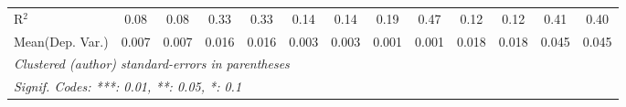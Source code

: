 \begin{tabular}{lcccccccccccc}
   R$^2$                                    & 0.08          & 0.08            & 0.33         & 0.33     & 0.14           & 0.14          & 0.19    & 0.47           & 0.12          & 0.12            & 0.41    & 0.40\\  
Mean(Dep. Var.) & 0.007 & 0.007 & 0.016 & 0.016 & 0.003 & 0.003 & 0.001 & 0.001 & 0.018 & 0.018 & 0.045 & 0.045 \\
   \midrule \midrule
   \multicolumn{13}{l}{\emph{Clustered (author) standard-errors in parentheses}}\\
   \multicolumn{13}{l}{\emph{Signif. Codes: ***: 0.01, **: 0.05, *: 0.1}}\\
\end{tabular}
\par\endgroup
